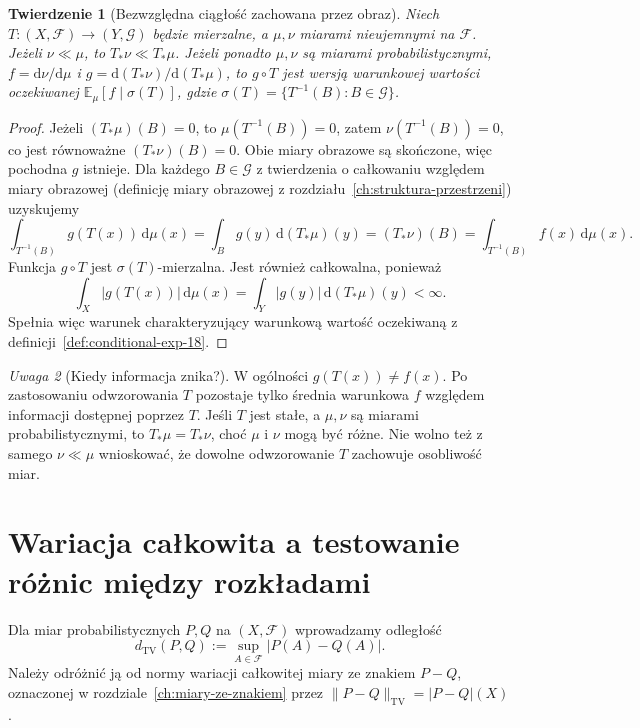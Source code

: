 \documentclass[11pt,a4paper,oneside]{book}
\numberwithin{equation}{chapter}
\theoremstyle{plain}
\newtheorem{twierdzenie}{Twierdzenie}[chapter]
\theoremstyle{definition}
\theoremstyle{remark}
\newtheorem{uwaga}[twierdzenie]{Uwaga}
\begin{document}
\begin{twierdzenie}[Bezwzględna ciągłość zachowana przez obraz]
\label{thm:image-ac-19}
Niech $T:(X,\mathcal F)\to(Y,\mathcal G)$ będzie mierzalne,
a $\mu,\nu$ miarami nieujemnymi na $\mathcal F$.
Jeżeli $\nu\ll\mu$, to $T_*\nu\ll T_*\mu$.
Jeżeli ponadto $\mu,\nu$ są miarami probabilistycznymi,
$f=\mathrm d\nu/\mathrm d\mu$ i
$g=\mathrm d(T_*\nu)/\mathrm d(T_*\mu)$,
to $g\circ T$ jest wersją warunkowej wartości oczekiwanej
$\mathbb E_\mu[f\mid\sigma(T)]$, gdzie
$\sigma(T)=\{T^{-1}(B):B\in\mathcal G\}$.
\end{twierdzenie}
\begin{proof}
Jeżeli $(T_*\mu)(B)=0$, to $\mu(T^{-1}(B))=0$,
zatem $\nu(T^{-1}(B))=0$, co jest równoważne
$(T_*\nu)(B)=0$. Obie miary obrazowe są skończone,
więc pochodna $g$ istnieje. Dla każdego $B\in\mathcal G$
z twierdzenia o całkowaniu względem miary obrazowej
(definicję miary obrazowej z rozdziału~\ref{ch:struktura-przestrzeni})
uzyskujemy
\[
\int_{T^{-1}(B)}g(T(x))\,\mathrm d\mu(x)
=\int_Bg(y)\,\mathrm d(T_*\mu)(y)
=(T_*\nu)(B)
=\int_{T^{-1}(B)}f(x)\,\mathrm d\mu(x).
\]
Funkcja $g\circ T$ jest $\sigma(T)$-mierzalna. Jest również
całkowalna, ponieważ
\[
\int_X|g(T(x))|\,\mathrm d\mu(x)
=\int_Y|g(y)|\,\mathrm d(T_*\mu)(y)<\infty.
\]
Spełnia więc warunek charakteryzujący warunkową wartość oczekiwaną
z definicji~\ref{def:conditional-exp-18}.
\end{proof}

\begin{uwaga}[Kiedy informacja znika?]
W ogólności $g(T(x))\neq f(x)$. Po zastosowaniu
odwzorowania $T$ pozostaje tylko średnia warunkowa $f$
względem informacji dostępnej poprzez $T$. Jeśli $T$
jest stałe, a $\mu,\nu$ są miarami probabilistycznymi,
to $T_*\mu=T_*\nu$, choć $\mu$ i $\nu$ mogą być różne.
Nie wolno też z samego $\nu\ll\mu$ wnioskować, że dowolne
odwzorowanie $T$ zachowuje osobliwość miar.
\end{uwaga}

\section{Wariacja całkowita a testowanie różnic między rozkładami}
Dla miar probabilistycznych $P,Q$ na $(X,\mathcal F)$
wprowadzamy odległość
\begin{equation}\label{eq:tv-prob-19}
d_{\mathrm{TV}}(P,Q):=\sup_{A\in\mathcal F}|P(A)-Q(A)|.
\end{equation}
Należy odróżnić ją od normy wariacji całkowitej miary ze znakiem
$P-Q$, oznaczonej w rozdziale~\ref{ch:miary-ze-znakiem} przez
$\|P-Q\|_{\mathrm{TV}}=|P-Q|(X)$.
\end{document}
